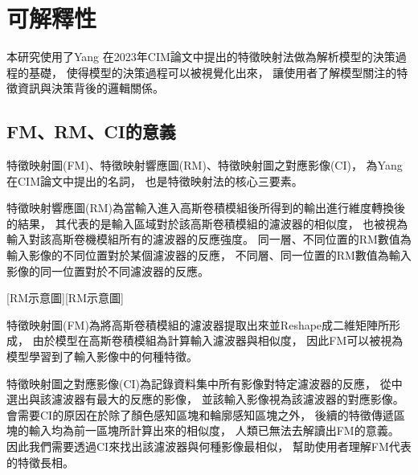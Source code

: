 \documentclass[class=NCU_thesis, crop=false]{standalone}
\begin{document}



\pagebreak
\section{可解釋性} 
本研究使用了Yang 在2023年CIM論文中提出的特徵映射法做為解析模型的決策過程的基礎，
使得模型的決策過程可以被視覺化出來，
讓使用者了解模型關注的特徵資訊與決策背後的邏輯關係。
	
	\subsection{FM、RM、CI的意義}
	\label{section:InterablePicture}
	特徵映射圖(FM)、特徵映射響應圖(RM)、特徵映射圖之對應影像(CI)，
	為Yang在CIM論文中提出的名詞，
	也是特徵映射法的核心三要素。

	特徵映射響應圖(RM)為當輸入進入高斯卷積模組後所得到的輸出進行維度轉換後的結果，
	其代表的是輸入區域對於該高斯卷積模組的濾波器的相似度，
	也被視為輸入對該高斯卷機模組所有的濾波器的反應強度。
	同一層、不同位置的RM數值為輸入影像的不同位置對於某個濾波器的反應，
	不同層、同一位置的RM數值為輸入影像的同一位置對於不同濾波器的反應。

	[RM示意圖\cite{YangCNNInterpretable}][RM示意圖]

	特徵映射圖(FM)為將高斯卷積模組的濾波器提取出來並Reshape成二維矩陣所形成，
	由於模型在高斯卷積模組為計算輸入濾波器與相似度，
	因此FM可以被視為模型學習到了輸入影像中的何種特徵。

	特徵映射圖之對應影像(CI)為記錄資料集中所有影像對特定濾波器的反應，
	從中選出與該濾波器有最大的反應的影像，
	並該輸入影像視為該濾波器的對應影像。
	會需要CI的原因在於除了顏色感知區塊和輪廓感知區塊之外，
	後續的特徵傳遞區塊的輸入均為前一區塊所計算出來的相似度，
	人類已無法去解讀出FM的意義。
	因此我們需要透過CI來找出該濾波器與何種影像最相似，
	幫助使用者理解FM代表的特徵長相。
\end{document}
